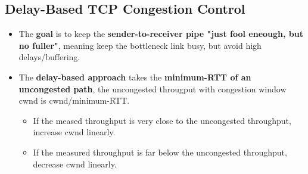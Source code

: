 \documentclass{article}
\begin{document}
    \subsection*{Delay-Based TCP Congestion Control}
    \begin{itemize}
        \item The \textbf{goal} is to keep the \textbf{sender-to-receiver pipe "just fool eneough, but no fuller"}, meaning keep the bottleneck link busy, but avoid high delays/buffering.
        \item The \textbf{delay-based approach} takes the \textbf{minimum-RTT of an uncongested path}, the uncongested througput with congestion window cwnd is cwnd/minimum-RTT.
        \begin{itemize}
            \item If the meased throughput is very close to the uncongested throughput, increase cwnd linearly.
            \item If the measured throughput is far below the uncongested throughput, decrease cwnd linearly.
        \end{itemize}
    \end{itemize}
\end{document}
